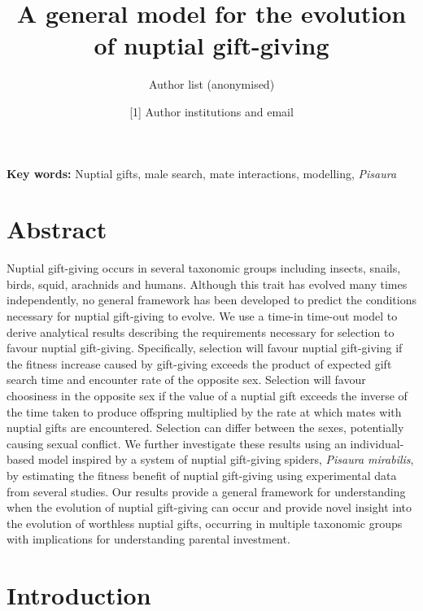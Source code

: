 \documentclass[
]{article}
\title{A general model for the evolution of nuptial gift-giving}
\author{Author list (anonymised)}
\date{{[}1{]} Author institutions and email}
\begin{document}
\maketitle

\textbf{Key words:} Nuptial gifts, male search, mate interactions,
modelling, \emph{Pisaura}

\hypertarget{abstract}{%
\section{Abstract}\label{abstract}}

Nuptial gift-giving occurs in several taxonomic groups including
insects, snails, birds, squid, arachnids and humans. Although this trait
has evolved many times independently, no general framework has been
developed to predict the conditions necessary for nuptial gift-giving to
evolve. We use a time-in time-out model to derive analytical results
describing the requirements necessary for selection to favour nuptial
gift-giving. Specifically, selection will favour nuptial gift-giving if
the fitness increase caused by gift-giving exceeds the product of
expected gift search time and encounter rate of the opposite sex.
Selection will favour choosiness in the opposite sex if the value of a
nuptial gift exceeds the inverse of the time taken to produce offspring
multiplied by the rate at which mates with nuptial gifts are
encountered. Selection can differ between the sexes, potentially causing
sexual conflict. We further investigate these results using an
individual-based model inspired by a system of nuptial gift-giving
spiders, \emph{Pisaura mirabilis}, by estimating the fitness benefit of
nuptial gift-giving using experimental data from several studies. Our
results provide a general framework for understanding when the evolution
of nuptial gift-giving can occur and provide novel insight into the
evolution of worthless nuptial gifts, occurring in multiple taxonomic
groups with implications for understanding parental investment.

\hypertarget{introduction}{%
\section{Introduction}\label{introduction}}
\end{document}
